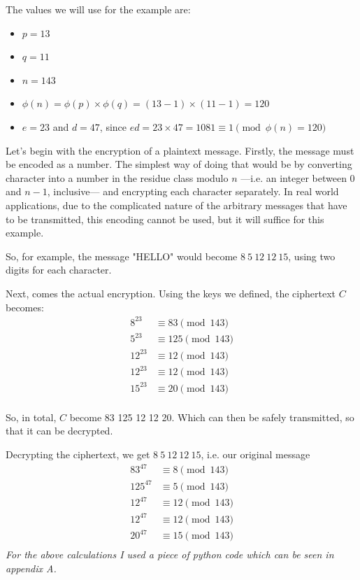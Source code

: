 \documentclass[12pt, titlepage]{article}
\begin{document}
The values we will use for the example are: 
\begin{itemize}
    \item $p=13$ 
    \item $q=11$
    \item $n=143$ 
    \item $\phi (n) = \phi(p) \times \phi(q) = (13-1) \times (11-1) = 120$ 
    \item $e = 23$ and $d = 47$, since $ed = 23 \times 47 = 1081 \equiv 1 \pmod{\phi(n)=120}$
\end{itemize}

Let's begin with the encryption of a plaintext message. Firstly, the message must be encoded
as a number. The simplest way of doing that would be by converting character into a number
in the residue class modulo $n$ ---i.e. an integer between $0$ and $n-1$, inclusive--- and
encrypting each character separately.  In real world applications, due to the complicated
nature of the arbitrary messages that have to be transmitted, this encoding cannot be used,
but it will suffice for this example.

So, for example, the message "HELLO" would become $8\ 5\ 12\ 12\ 15$, using two digits for
each character.

Next, comes the actual encryption. Using the keys we defined, the ciphertext $C$ becomes: 
\begin{align*}
    8^{23}  &\equiv 83 \pmod{143} \\
    5^{23}  &\equiv 125 \pmod{143} \\
    12^{23}  &\equiv 12 \pmod{143} \\
    12^{23}  &\equiv 12 \pmod{143} \\
    15^{23}  &\equiv 20 \pmod{143} \\
\end{align*}

So, in total, $C$ become 83 125 12 12 20. Which can then be safely transmitted, so that it can be decrypted.   

Decrypting the ciphertext, we get $8\ 5\ 12\ 12\ 15$, i.e. our original message
\begin{align*}
    83^{47}  &\equiv 8 \pmod{143} \\
    125^{47}  &\equiv 5 \pmod{143} \\
    12^{47}  &\equiv 12 \pmod{143} \\
    12^{47}  &\equiv 12 \pmod{143} \\
    20^{47}  &\equiv 15 \pmod{143} \\
\end{align*}
\textit{For the above calculations I used a piece of python code which can be seen in
appendix A.}
\end{document}
